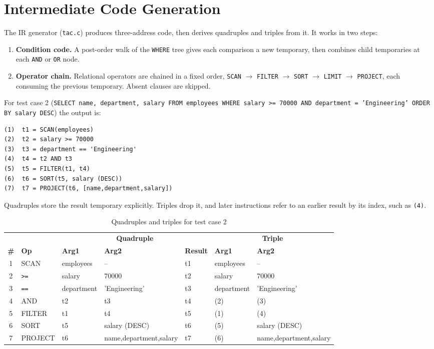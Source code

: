 \documentclass[12pt,a4paper]{report}
\newcommand{\codeus}{\textunderscore\allowbreak}
\DeclareRobustCommand{\code}[1]{\texttt{\let\_\codeus #1}}
\begin{document}
\section{Intermediate Code Generation}
The IR generator (\code{tac.c}) produces three-address code, then derives quadruples and triples from it. It works in two steps:
\begin{enumerate}
  \item \textbf{Condition code.} A post-order walk of the \code{WHERE} tree gives each comparison a new temporary, then combines child temporaries at each \code{AND} or \code{OR} node.
  \item \textbf{Operator chain.} Relational operators are chained in a fixed order, \code{SCAN} $\rightarrow$ \code{FILTER} $\rightarrow$ \code{SORT} $\rightarrow$ \code{LIMIT} $\rightarrow$ \code{PROJECT}, each consuming the previous temporary. Absent clauses are skipped.
\end{enumerate}
For test case 2 (\code{SELECT name, department, salary FROM employees WHERE salary >= 70000 AND department = 'Engineering' ORDER BY salary DESC}) the output is:
\begin{Verbatim}
(1)  t1 = SCAN(employees)
(2)  t2 = salary >= 70000
(3)  t3 = department == 'Engineering'
(4)  t4 = t2 AND t3
(5)  t5 = FILTER(t1, t4)
(6)  t6 = SORT(t5, salary (DESC))
(7)  t7 = PROJECT(t6, [name,department,salary])
\end{Verbatim}
Quadruples store the result temporary explicitly. Triples drop it, and later instructions refer to an earlier result by its index, such as \code{(4)}.
\begin{table}[H]
\centering\footnotesize
\setlength{\tabcolsep}{4pt}
\begin{tabular}{|c|l|l|l|l|l|l|}
\hline
 & & \multicolumn{3}{c|}{\textbf{Quadruple}} & \multicolumn{2}{c|}{\textbf{Triple}} \\ \cline{3-7}
\textbf{\#} & \textbf{Op} & \textbf{Arg1} & \textbf{Arg2} & \textbf{Result} & \textbf{Arg1} & \textbf{Arg2} \\ \hline
1 & SCAN & employees & -- & t1 & employees & -- \\ \hline
2 & \code{>=} & salary & 70000 & t2 & salary & 70000 \\ \hline
3 & \code{==} & department & 'Engineering' & t3 & department & 'Engineering' \\ \hline
4 & AND & t2 & t3 & t4 & (2) & (3) \\ \hline
5 & FILTER & t1 & t4 & t5 & (1) & (4) \\ \hline
6 & SORT & t5 & salary (DESC) & t6 & (5) & salary (DESC) \\ \hline
7 & PROJECT & t6 & name,department,salary & t7 & (6) & name,department,salary \\ \hline
\end{tabular}
\caption{Quadruples and triples for test case 2}
\end{table}
\end{document}
